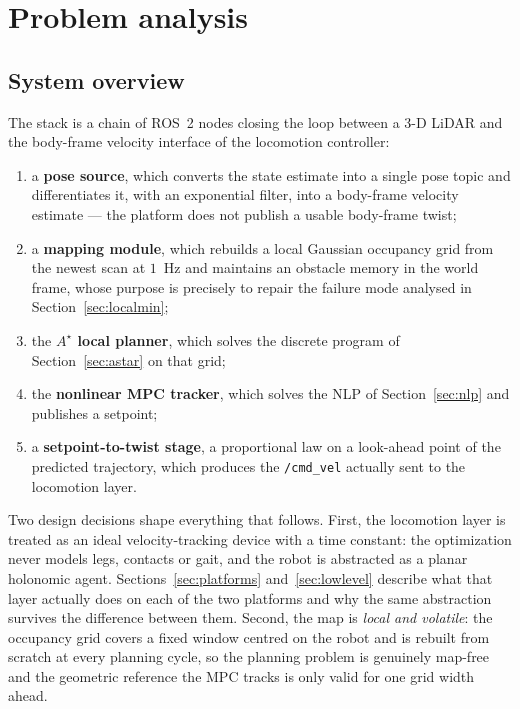 \documentclass[11pt,a4paper]{article}
\newcommand{\astar}{$A^\star$}
\begin{document}
\section{Problem analysis}
\label{sec:problem}

\subsection{System overview}
\label{sec:overview}

The stack is a chain of ROS~2 nodes closing the loop between a 3-D LiDAR and the body-frame velocity
interface of the locomotion controller:

\begin{enumerate}[label=\arabic*.]
  \item a \textbf{pose source}, which converts the state estimate into a single pose topic and differentiates
        it, with an exponential filter, into a body-frame velocity estimate --- the platform does not publish
        a usable body-frame twist;
  \item a \textbf{mapping module}, which rebuilds a local Gaussian occupancy grid from the newest scan at
        $1$~Hz and maintains an obstacle memory in the world frame, whose purpose is precisely to repair the
        failure mode analysed in Section~\ref{sec:localmin};
  \item the \textbf{\astar{} local planner}, which solves the discrete program of Section~\ref{sec:astar} on
        that grid;
  \item the \textbf{nonlinear MPC tracker}, which solves the NLP of Section~\ref{sec:nlp} and publishes a
        setpoint;
  \item a \textbf{setpoint-to-twist stage}, a proportional law on a look-ahead point of the predicted
        trajectory, which produces the \texttt{/cmd\_vel} actually sent to the locomotion layer.
\end{enumerate}

Two design decisions shape everything that follows. First, the locomotion layer is treated as an ideal
velocity-tracking device with a time constant: the optimization never models legs, contacts or gait, and the
robot is abstracted as a planar holonomic agent. Sections~\ref{sec:platforms} and~\ref{sec:lowlevel} describe
what that layer actually does on each of the two platforms and why the same abstraction survives the
difference between them. Second, the map is \emph{local and volatile}: the occupancy grid covers a fixed
window centred on the robot and is rebuilt from scratch at every planning cycle, so the planning problem is
genuinely map-free and the geometric reference the MPC tracks is only valid for one grid width ahead.
\end{document}
